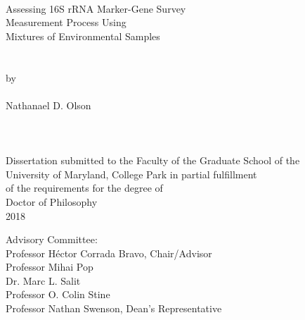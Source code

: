 
\thispagestyle{empty}
\hbox{\ }
\vspace{1in}
\renewcommand{\baselinestretch}{1}
\small\normalsize
\begin{center}

\large{Assessing 16S rRNA Marker-Gene Survey}\\
\large{Measurement Process Using} \\
\large{Mixtures of Environmental Samples} \\
\ \\
\ \\
\large{by} \\
\ \\
\large{Nathanael D. Olson}%
\ \\
\ \\
\ \\
\ \\
\normalsize
Dissertation submitted to the Faculty of the Graduate School of the \\
University of Maryland, College Park in partial fulfillment \\
of the requirements for the degree of \\
Doctor of Philosophy \\
2018
\end{center}

\vspace{7.5em}

\noindent Advisory Committee: \\
Professor Héctor Corrada Bravo, Chair/Advisor \\
Professor Mihai Pop \\
Dr. Marc L. Salit \\
Professor O. Colin Stine \\
Professor Nathan Swenson, Dean's Representative
